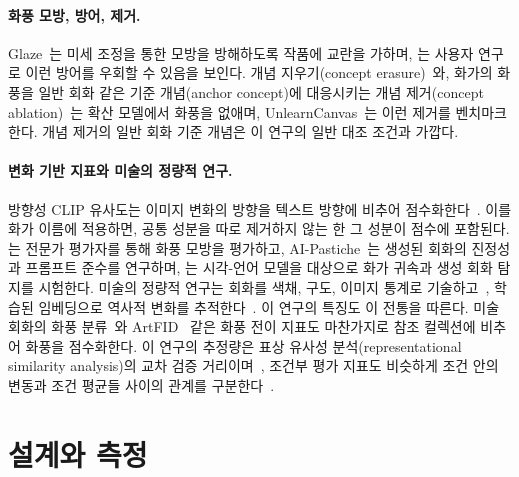 \documentclass[10pt]{article}
\begin{document}
\paragraph{화풍 모방, 방어, 제거.}
Glaze~\citep{shan2023glaze}는 미세 조정을 통한 모방을 방해하도록 작품에 교란을 가하며,
\citet{honig2025adversarial}는 사용자 연구로 이런 방어를 우회할 수 있음을 보인다. 개념
지우기(concept erasure)~\citep{gandikota2023erasing}와, 화가의 화풍을 일반 회화 같은 기준 개념(anchor
concept)에 대응시키는 개념 제거(concept ablation)~\citep{kumari2023ablating}는 확산 모델에서 화풍을
없애며, UnlearnCanvas~\citep{zhang2024unlearncanvas}는 이런 제거를 벤치마크한다. 개념 제거의 일반 회화
기준 개념은 이 연구의 일반 대조 조건과 가깝다.

\paragraph{변화 기반 지표와 미술의 정량적 연구.}
방향성 CLIP 유사도는 이미지 변화의 방향을 텍스트 방향에 비추어
점수화한다~\citep{gal2022stylegannada,brooks2023instructpix2pix}. 이를 화가 이름에 적용하면, 공통 성분을
따로 제거하지 않는 한 그 성분이 점수에 포함된다. \citet{deliege2025}는 전문가 평가자를 통해 화풍 모방을
평가하고, AI-Pastiche~\citep{asperti2025pastiche}는 생성된 회화의 진정성과 프롬프트 준수를 연구하며,
\citet{fu2025aiwikiart}는 시각-언어 모델을 대상으로 화가 귀속과 생성 회화 탐지를 시험한다. 미술의 정량적
연구는 회화를 색채, 구도, 이미지 통계로 기술하고~\citep{kim2014,sigaki2018,lee2020}, 학습된 임베딩으로
역사적 변화를 추적한다~\citep{kim2026}. 이 연구의 특징도 이 전통을 따른다. 미술 회화의 화풍
분류~\citep{karayev2014recognizing,saleh2016large}와 ArtFID~\citep{wright2022artfid} 같은 화풍 전이 지표도
마찬가지로 참조 컬렉션에 비추어 화풍을 점수화한다. 이 연구의 추정량은 표상 유사성 분석(representational
similarity analysis)의 교차 검증 거리이며~\citep{diedrichsen2017representational}, 조건부 평가 지표도
비슷하게 조건 안의 변동과 조건 평균들 사이의 관계를 구분한다~\citep{benny2021conditional}.

\section{설계와 측정}\label{sec:design}
\end{document}
